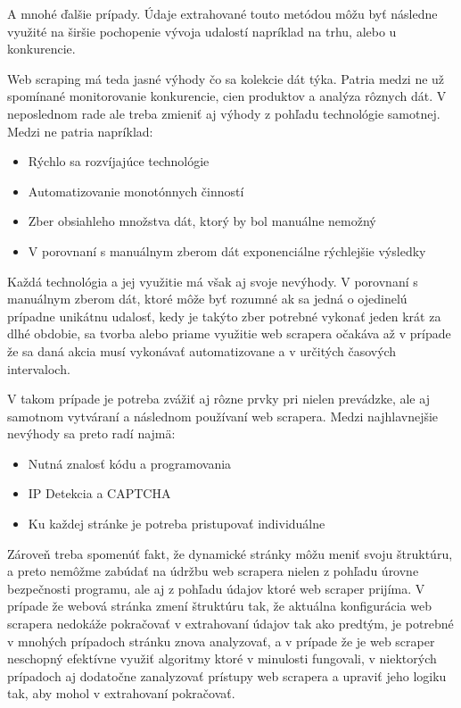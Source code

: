 A mnohé ďalšie prípady. Údaje extrahované touto metódou môžu byť následne využité na širšie pochopenie vývoja udalostí napríklad na trhu, alebo u konkurencie.

Web scraping má teda jasné výhody čo sa kolekcie dát týka. Patria medzi ne už spomínané monitorovanie konkurencie, cien produktov a analýza rôznych dát. V neposlednom rade ale treba zmieniť aj výhody z pohľadu technológie samotnej. Medzi ne patria napríklad:

\begin{itemize}
    \item {Rýchlo sa rozvíjajúce technológie}
    \item {Automatizovanie monotónnych činností}
    \item {Zber obsiahleho množstva dát, ktorý by bol manuálne nemožný}
    \item {V porovnaní s manuálnym zberom dát exponenciálne rýchlejšie výsledky}
\end{itemize}

Každá technológia a jej využitie má však aj svoje nevýhody. V porovnaní s manuálnym zberom dát, ktoré môže byť rozumné ak sa jedná o ojedinelú prípadne unikátnu udalosť, kedy je takýto zber potrebné vykonať jeden krát za dlhé obdobie, sa tvorba alebo priame využitie web scrapera očakáva až v prípade že sa daná akcia musí vykonávať automatizovane a v určitých časových intervaloch. \cite{WebScrap}

V takom prípade je potreba zvážiť aj rôzne prvky pri nielen prevádzke, ale aj samotnom vytváraní a následnom používaní web scrapera. Medzi najhlavnejšie nevýhody sa preto radí najmä:

\begin{itemize}
    \item {Nutná znalosť kódu a programovania}
    \item {IP Detekcia a CAPTCHA}
    \item {Ku každej stránke je potreba pristupovať individuálne}
\end{itemize}

Zároveň treba spomenúť fakt, že dynamické stránky môžu meniť svoju štruktúru, a preto nemôžme zabúdať na údržbu web scrapera nielen z pohľadu úrovne bezpečnosti programu, ale aj z pohľadu údajov ktoré web scraper prijíma. V prípade že webová stránka zmení štruktúru tak, že aktuálna konfigurácia web scrapera nedokáže pokračovať v extrahovaní údajov tak ako predtým, je potrebné v mnohých prípadoch stránku znova analyzovať, a v prípade že je web scraper neschopný efektívne využiť algoritmy ktoré v minulosti fungovali, v niektorých prípadoch aj dodatočne zanalyzovať prístupy web scrapera a upraviť jeho logiku tak, aby mohol v extrahovaní pokračovať.

